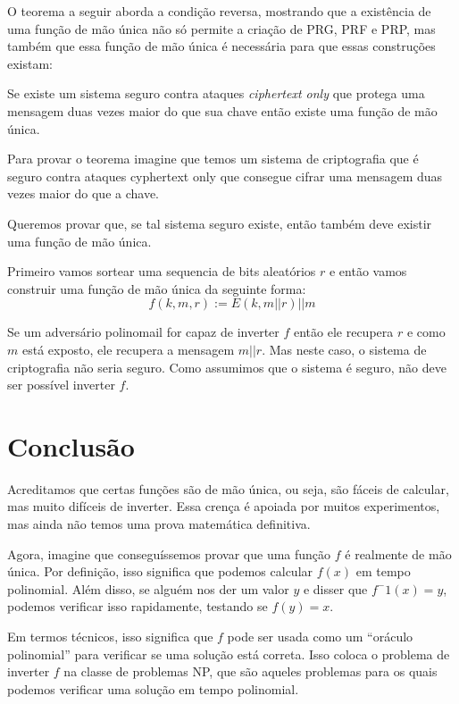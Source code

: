O teorema a seguir aborda a condição reversa, mostrando que a existência de uma função de mão única não só permite a criação de PRG, PRF e PRP, mas também que essa função de mão única é necessária para que essas construções existam:

\begin{theorem}
  Se existe um sistema seguro contra ataques {\em ciphertext only} que protega uma mensagem duas vezes maior do que sua chave então existe uma função de mão única.
\end{theorem}

Para provar o teorema imagine que temos um sistema de criptografia que é seguro contra ataques cyphertext only que consegue cifrar uma mensagem duas vezes maior do que a chave.

Queremos provar que, se tal sistema seguro existe, então também deve existir uma função de mão única.

Primeiro vamos sortear uma sequencia de bits aleatórios $r$ e então vamos construir uma função de mão única da seguinte forma:
\begin{displaymath}
  f(k, m, r) := E(k, m||r)||m
\end{displaymath}

Se um adversário polinomail for capaz de inverter $f$ então ele recupera $r$ e como $m$ está exposto, ele recupera a mensagem $m||r$.
Mas neste caso, o sistema de criptografia não seria seguro.
Como assumimos que o sistema é seguro, não deve ser possível inverter $f$.

\section{Conclusão}

Acreditamos que certas funções são de mão única, ou seja, são fáceis de calcular, mas muito difíceis de inverter.
Essa crença é apoiada por muitos experimentos, mas ainda não temos uma prova matemática definitiva.

Agora, imagine que conseguíssemos provar que uma função $f$ é realmente de mão única.
Por definição, isso significa que podemos calcular $f(x)$ em tempo polinomial.
Além disso, se alguém nos der um valor $y$ e disser que $f^-1(x) = y$, podemos verificar isso rapidamente, testando se $f(y)=x$.

Em termos técnicos, isso significa que $f$ pode ser usada como um ``oráculo polinomial'' para verificar se uma solução está correta.
Isso coloca o problema de inverter $f$ na classe de problemas NP, que são aqueles problemas para os quais podemos verificar uma solução em tempo polinomial.

